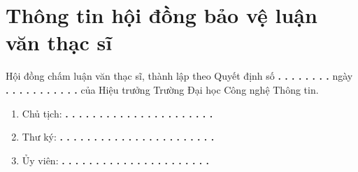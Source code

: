 \chapter*{Thông tin hội đồng bảo vệ luận văn thạc sĩ}

Hội đồng chấm luận văn thạc sĩ, thành lập theo Quyết định số \textbf{ . . . . . . . .} ngày \textbf{ . . . . . . . . . . .} của Hiệu trưởng Trường Đại học Công nghệ Thông tin.

\begin{enumerate}
    \item Chủ tịch: \textbf{ . . . . . . . . . . . . . . . . . . . . . .}
    \item Thư ký: \textbf{ . . . . . . . . . . . . . . . . . . . . . . .}
    \item Ủy viên: \textbf{ . . . . . . . . . . . . . . . . . . . . . .}
\end{enumerate}